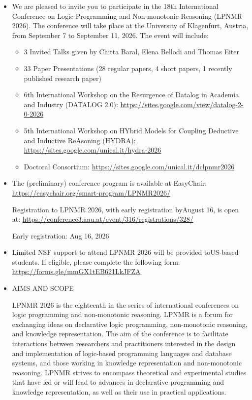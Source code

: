 \documentclass[prodmode,acmtecs]{acmsmall} %
\begin{document}
\begin{itemize}\item  We are pleased to invite you to participate in the 18th International Conference on Logic Programming and Non-monotonic Reasoning (LPNMR 2026). The conference will take place at the University of Klagenfurt, Austria, from September 7 to September 11, 2026. The event will include: 
 
\begin{itemize}\item  3 Invited Talks given by Chitta Baral, Elena Bellodi and Thomas Eiter
\item  33 Paper Presentations (28 regular papers, 4 short papers, 1 recently published research paper)
\item  6th International Workshop on the Resurgence of Datalog in Academia and Industry (DATALOG 2.0): \href{https://sites.google.com/view/datalog-2-0-2026}{https://sites.google.com/view/datalog-2-0-2026}
\item  5th International Workshop on HYbrid Models for Coupling Deductive and Inductive ReAsoning (HYDRA): \href{https://sites.google.com/unical.it/hydra-2026}{https://sites.google.com/unical.it/hydra-2026}
\item  Doctoral Consortium: \href{https://sites.google.com/unical.it/dclpnmr2026}{https://sites.google.com/unical.it/dclpnmr2026}
\end{itemize} 
\item  The (preliminary) conference program is available at EasyChair: \href{https://easychair.org/smart-program/LPNMR2026/}{https://easychair.org/smart-program/LPNMR2026/} 
 
  Registration to LPNMR 2026, with early registration byAugust 16, is open at: \href{https://conference3.aau.at/event/316/registrations/328/}{https://conference3.aau.at/event/316/registrations/328/} 
 
Early registration: Aug 16, 2026 
 
\item  Limited NSF support to attend LPNMR 2026 will be provided toUS-based students. If eligible, please complete the following form: \href{https://forms.gle/mmGX1tEB621LkJFZA}{https://forms.gle/mmGX1tEB621LkJFZA} 
 
\item  AIMS AND SCOPE 
 
  LPNMR 2026 is the eighteenth in the series of international conferences on logic programming and non-monotonic reasoning. LPNMR is a forum for exchanging ideas on declarative logic programming, non-monotonic reasoning, and knowledge representation. The aim of the conference is to facilitate interactions between researchers and practitioners interested in the design and implementation of logic-based programming languages and database systems, and those working in knowledge representation and non-monotonic reasoning. LPNMR strives to encompass theoretical and experimental studies that have led or will lead to advances in declarative programming and knowledge representation, as well as their use in practical applications. 
 

\end{itemize}
\end{document}
